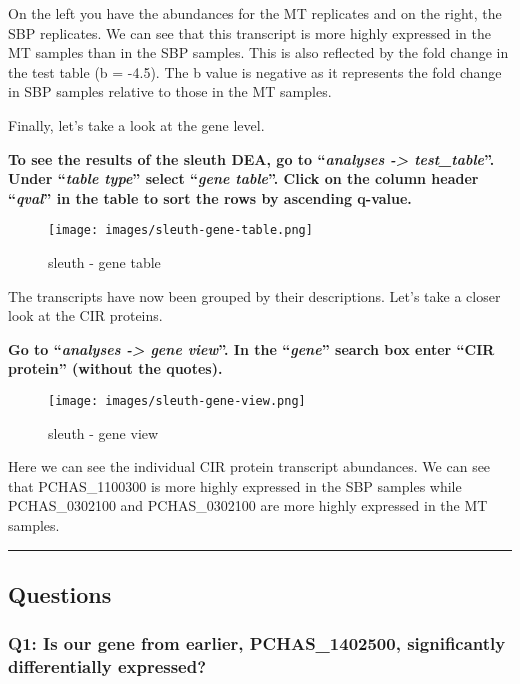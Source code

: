 \documentclass[11pt]{article}
\begin{document}
    On the left you have the abundances for the MT replicates and on the
right, the SBP replicates. We can see that this transcript is more
highly expressed in the MT samples than in the SBP samples. This is also
reflected by the fold change in the test table (b = -4.5). The b value
is negative as it represents the fold change in SBP samples relative to
those in the MT samples.

Finally, let's take a look at the gene level.

\textbf{To see the results of the sleuth DEA, go to ``\textit{analyses
-\textgreater{} test\_table}''. Under ``\textit{table type}'' select
``\textit{gene table}''. Click on the column header ``\textit{qval}'' in the
table to sort the rows by ascending q-value.}

    \begin{figure}[!h]
\centering
\texttt{[image: images/sleuth-gene-table.png]}
\caption{sleuth - gene table}
\end{figure}

    The transcripts have now been grouped by their descriptions. Let's take
a closer look at the CIR proteins.

\newpage

\textbf{Go to ``\textit{analyses -\textgreater{} gene view}''. In the
``\textit{gene}'' search box enter ``CIR protein'' (without the quotes).}

    \begin{figure}[!h]
\centering
\texttt{[image: images/sleuth-gene-view.png]}
\caption{sleuth - gene view}
\end{figure}

    Here we can see the individual CIR protein transcript abundances. We can
see that PCHAS\_1100300 is more highly expressed in the SBP samples
while PCHAS\_0302100 and PCHAS\_0302100 are more highly expressed in the
MT samples.

    \begin{center}\rule{0.5\linewidth}{.4pt}\end{center}

    \hypertarget{questions}{%
\subsection{Questions}\label{questions}}

\hypertarget{q1-is-our-gene-from-earlier-pchas_1402500-significantly-differentially-expressed}{%
\subsubsection{Q1: Is our gene from earlier, PCHAS\_1402500,
significantly differentially
expressed?}\label{q1-is-our-gene-from-earlier-pchas_1402500-significantly-differentially-expressed}}
\end{document}
